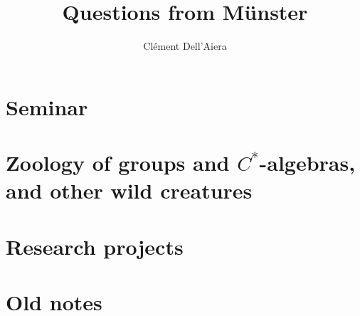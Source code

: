 \documentclass[a4paper,12pt]{book}
\title{\textbf{Questions from Münster}}
\date{}
\author{ Clément Dell'Aiera}
\begin{document}
\maketitle

\pagestyle{plain}
\tableofcontents

\pagestyle{fancy}
\chapter{Seminar}


\chapter{Zoology of groups and $C^*$-algebras, and other wild creatures}




\chapter{Research projects}


\newpage
\chapter{Old notes}





%


 
\end{document}
